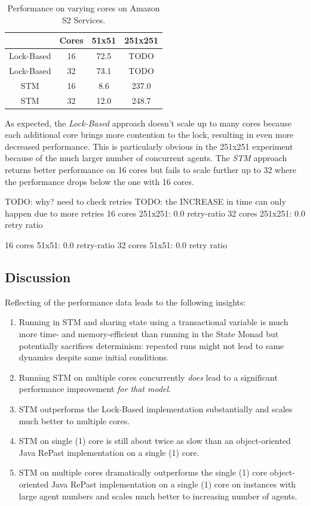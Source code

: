 \begin{table}
	\centering
  	\begin{tabular}{ c || c | c | c }
                   & Cores & 51x51   & 251x251 \\ \hline \hline 
    	Lock-Based & 16    & 72.5    & TODO    \\ \hline
    	Lock-Based & 32    & 73.1    & TODO    \\ \hline \hline 
   		
   		STM        & 16    & 8.6     & 237.0   \\ \hline
   		STM        & 32    & 12.0    & 248.7   \\ \hline \hline
   	\end{tabular}
  	
  	\caption{Performance on varying cores on Amazon S2 Services.}
	\label{tab:sir_varying_cores_amazon}
\end{table}

As expected, the \textit{Lock-Based} approach doesn't scale up to many cores because each additional core brings more contention to the lock, resulting in even more decreased performance. This is particularly obvious in the 251x251 experiment because of the much larger number of concurrent agents. The \textit{STM} approach returns better performance on 16 cores but fails to scale further up to 32 where the performance drops below the one with 16 cores. %

TODO: why? need to check retries  
TODO: the INCREASE in time can only happen due to more retries 
16 cores 251x251: 0.0 retry-ratio
32 cores 251x251: 0.0 retry ratio

16 cores 51x51: 0.0 retry-ratio
32 cores 51x51: 0.0 retry ratio

\subsection{Discussion}
Reflecting of the performance data leads to the following insights:
\begin{enumerate}
	\item Running in STM and sharing state using a transactional variable is much more time- and memory-efficient than running in the State Monad but potentially sacrifices determinism: repeated runs might not lead to same dynamics despite same initial conditions.
	\item Running STM on multiple cores concurrently \textit{does} lead to a significant performance improvement \textit{for that model}.
	\item STM outperforms the Lock-Based implementation substantially and scales much better to multiple cores.
	\item STM on single (1) core is still about twice as slow than an object-oriented Java RePast implementation on a single (1) core.
	\item STM on multiple cores dramatically outperforms the single (1) core object-oriented Java RePast implementation on a single (1) core on instances with large agent numbers and scales much better to increasing number of agents.
\end{enumerate}